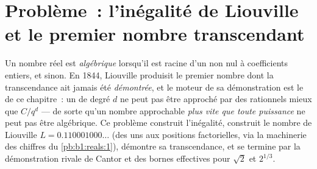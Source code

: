 \section{Problème~: l'inégalité de Liouville et le premier
nombre transcendant}

\begin{problem}
\label{pb:b1:derivative:1}
Un nombre réel est \emph{algébrique} lorsqu'il est racine d'un 
non nul à coefficients entiers, et \emph{}
sinon. En 1844, Liouville produisit le premier nombre dont la
transcendance ait jamais été \emph{démontrée}, et le moteur de sa
démonstration est le  de ce chapitre~: un
 de degré $d$ ne peut pas être approché par des rationnels
mieux que $C/q^d$ --- de sorte qu'un nombre approchable \emph{plus vite que
toute puissance} ne peut pas être algébrique. Ce problème construit
l'inégalité, construit le nombre de Liouville $L = 0.110001000\dots$ (des uns
aux positions factorielles, via la machinerie des chiffres du
\cref{pb:b1:reals:1}), démontre sa transcendance, et se termine par la
démonstration rivale de Cantor et des bornes effectives pour $\sqrt2$ et
$2^{1/3}$.


\end{problem}

